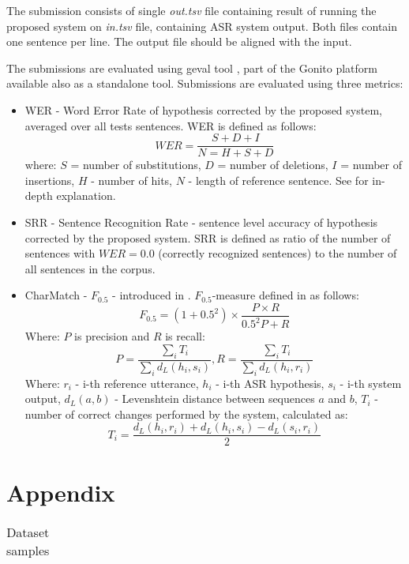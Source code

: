 \documentclass[10pt, a4paper]{article}
\begin{document}
The submission consists of single \textit{out.tsv} file containing result of running the proposed system on \textit{in.tsv} file,
containing ASR system output. Both files contain one sentence per line. The output file should be aligned with the input.
%

The submissions are evaluated using geval tool \cite{geval}, part of the Gonito platform available also as a standalone tool.
Submissions are evaluated using three metrics:
\begin{itemize}
\item \label{rel_wer} WER - Word Error Rate of hypothesis corrected by the proposed system, averaged over all tests sentences.
WER is defined as follows:
\[WER = \frac{S + D + I}{N = H + S + D}\]
where: $S$ = number of substitutions, $D$ = number of deletions, $I$ = number of insertions, $H$ - number of hits, $N$ - length of reference sentence. See \cite{Morris2004FromWA} for in-depth explanation.
\item SRR - Sentence Recognition Rate - sentence level accuracy of hypothesis corrected by the proposed system.
SRR is defined as ratio of the number of sentences with $WER = 0.0$ (correctly recognized
sentences) to the number of all sentences in the corpus.
\item CharMatch - $ F_{0.5} $ - introduced in \cite{jassem-17}. $F_{0.5}$-measure defined in as follows:
  $$ F_{0.5} = (1+0.5^2) \times \frac{P \times R}{0.5^2 P + R} $$
Where: $ P $ is precision and $ R $ is recall:
$$ P = \frac{\sum_i T_i}{\sum_i d_L(h_i,s_i)} , R = \frac{\sum_i T_i}{\sum_i d_L(h_i,r_i)} $$
Where: $r_i$ - i-th reference utterance, $h_i$ - i-th ASR hypothesis,  $s_i$ - i-th system output, $d_L(a,b)$ - Levenshtein distance between sequences $a$ and $b$, $ T_i $ - number of correct changes performed by the system, calculated as:
$$ T_i = \frac{d_L(h_i,r_i) + d_L(h_i, s_i) - d_L(s_i, r_i)}{2} $$

\end{itemize}



 

\onecolumn

\section*{Appendix}
\label{appendix}
	
\begin{table}[ht]
\begin{center}
	\begin{tabular}{|r|p{15cm}|}
  \hline

	
	
	\hline
	\end{tabular}
\end{center}

\caption{Dataset samples}
\end{table}

%	
\end{document}
